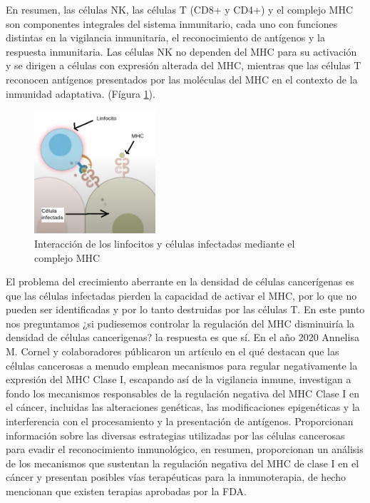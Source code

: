\documentclass{article}
\begin{document}
En resumen, las células NK, las células T (CD8+ y CD4+) y el complejo MHC son componentes integrales del sistema inmunitario, cada uno con funciones distintas en la vigilancia inmunitaria, el reconocimiento de antígenos y la respuesta inmunitaria. Las células NK no dependen del MHC para su activación y se dirigen a células con expresión alterada del MHC, mientras que las células T reconocen antígenos presentados por las moléculas del MHC en el contexto de la inmunidad adaptativa\cite{Jiang2019}. (Fígura \ref{fig:mhc}).

\begin{figure}[ht]
    \centering
    \includegraphics[width=0.4\textwidth]{images/mhc.png}
    \caption{Interacción de los linfocitos y células infectadas mediante el complejo MHC}
    \label{fig:mhc}
\end{figure}

El problema del crecimiento aberrante en la densidad de células cancerígenas es que las células infectadas pierden la capacidad de activar el MHC, por lo que no pueden ser identificadas y por lo tanto destruidas por las células T. En este punto nos preguntamos ¿si pudiesemos controlar la regulación del MHC disminuiría la densidad de células cancerigenas? la respuesta es que sí. En el año 2020 Annelisa M. Cornel y colaboradores\cite{Cornel072020} públicaron un artículo en el qué destacan que las células cancerosas a menudo emplean mecanismos para regular negativamente la expresión del MHC Clase I, escapando así de la vigilancia inmune, investigan a fondo los mecanismos responsables de la regulación negativa del MHC Clase I en el cáncer, incluidas las alteraciones genéticas, las modificaciones epigenéticas y la interferencia con el procesamiento y la presentación de antígenos. Proporcionan información sobre las diversas estrategias utilizadas por las células cancerosas para evadir el reconocimiento inmunológico, en resumen, proporcionan un análisis de los mecanismos que sustentan la regulación negativa del MHC de clase I en el cáncer y presentan posibles vías terapéuticas para la inmunoterapia, de hecho mencionan que existen terapias  aprobadas por la FDA.
\end{document}
